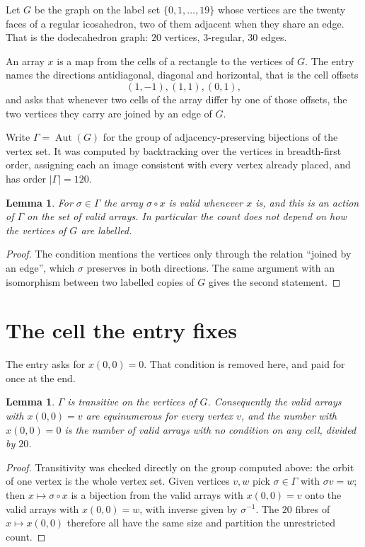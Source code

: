\documentclass[11pt,a4paper]{article}
\theoremstyle{plain}
\newtheorem{lemma}[theorem]{Lemma}
\theoremstyle{definition}
\begin{document}
Let $G$ be the graph on the label set $\{0,1,\dots,19\}$ whose vertices are the twenty faces of a regular icosahedron, two of them adjacent when they share an edge. That is the dodecahedron graph: $20$ vertices, $3$-regular, $30$ edges.

An array $x$ is a map from the cells of a rectangle to the vertices of $G$. The entry names the
directions antidiagonal, diagonal and horizontal, that is the cell offsets
\[
(1,-1), (1,1), (0,1),
\]
and asks that whenever two cells of the array differ by one of those offsets, the two vertices
they carry are joined by an edge of $G$.

Write $\Gamma=\operatorname{Aut}(G)$ for the group of adjacency-preserving bijections of the
vertex set. It was computed by backtracking over the vertices in breadth-first order, assigning
each an image consistent with every vertex already placed, and has order $|\Gamma|=120$.

\begin{lemma}\label{lem:act}
For $\sigma\in\Gamma$ the array $\sigma\circ x$ is valid whenever $x$ is, and this is an action
of $\Gamma$ on the set of valid arrays. In particular the count does not depend on how the
vertices of $G$ are labelled.
\end{lemma}

\begin{proof}
The condition mentions the vertices only through the relation ``joined by an edge'', which
$\sigma$ preserves in both directions. The same argument with an isomorphism between two
labelled copies of $G$ gives the second statement.
\end{proof}

\section{The cell the entry fixes}

The entry asks for $x(0,0)=0$. That condition is removed here, and paid for once at the end.

\begin{lemma}\label{lem:fibre}
$\Gamma$ is transitive on the vertices of $G$. Consequently the valid arrays with $x(0,0)=v$
are equinumerous for every vertex $v$, and the number with $x(0,0)=0$ is the number of valid
arrays with no condition on any cell, divided by $20$.
\end{lemma}

\begin{proof}
Transitivity was checked directly on the group computed above: the orbit of one vertex is the
whole vertex set. Given vertices $v,w$ pick $\sigma\in\Gamma$ with $\sigma v=w$; then
$x\mapsto\sigma\circ x$ is a bijection from the valid arrays with $x(0,0)=v$ onto the valid
arrays with $x(0,0)=w$, with inverse given by $\sigma^{-1}$. The $20$ fibres of
$x\mapsto x(0,0)$ therefore all have the same size and partition the unrestricted count.
\end{proof}
\end{document}
